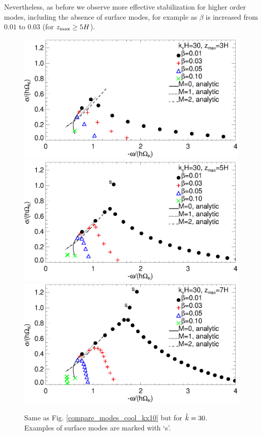 Nevertheless, as before we observe more effective stabilization for
higher order modes, including the absence of surface modes, for
example as $\beta$ is increased from $0.01$ to $0.03$ (for $z_\mathrm{max}\geq
5H$). 

\begin{figure}
  \includegraphics[width=\linewidth,clip=true,trim=0cm 1.75cm 0cm
  0cm]{figures/compare_modes_cool_kx30_z3_analytic.ps} 
  \includegraphics[width=\linewidth,clip=true,trim=0cm 1.75cm 0cm
  0cm]{figures/compare_modes_cool_kx30_z5_analytic.ps}
  \includegraphics[width=\linewidth]{figures/compare_modes_cool_kx30_z7_analytic.ps}
  \caption{Same as Fig. \ref{compare_modes_cool_kx10} but for
    $\hat{k}=30$. Examples of surface modes are marked with `s'. 
    \label{compare_modes_cool_kx30} 
  }
\end{figure}

